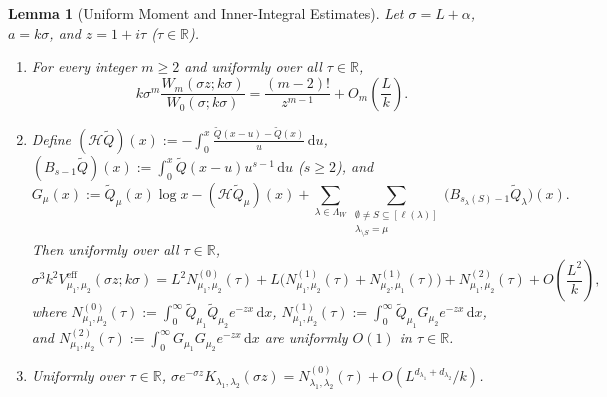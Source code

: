 \documentclass[11pt, reqno]{amsart}
\newtheorem{lemma}{Lemma}[section]
\theoremstyle{remark}
\numberwithin{equation}{section}
\newcommand{\R}{\mathbb{R}}
\newcommand{\cH}{\mathcal{H}}
\newcommand{\dd}{\,\mathrm{d}}
\begin{document}
\begin{lemma}[Uniform Moment and Inner-Integral Estimates]\label{lem:uniform-W-V}
Let $\sigma = L + \alpha$, $a = k\sigma$, and $z = 1+i\tau$ ($\tau \in \R$).
\begin{enumerate}
\item[(i)] For every integer $m \ge 2$ and uniformly over all $\tau \in \R$,
\begin{equation}\label{eq:Wm-uniform}
k \sigma^m \frac{W_m(\sigma z; k\sigma)}{W_0(\sigma; k\sigma)} = \frac{(m-2)!}{z^{m-1}} + O_m\!\left(\frac{L}{k}\right).
\end{equation}
\item[(ii)] Define $(\cH\widetilde{Q})(x) := -\int_0^x \frac{\widetilde{Q}(x-u)-\widetilde{Q}(x)}{u}\dd u$,
$(B_{s-1}\widetilde{Q})(x) := \int_0^x \widetilde{Q}(x-u) u^{s-1}\dd u$ ($s \ge 2$), and
\[
G_\mu(x) := \widetilde{Q}_\mu(x)\log x - (\cH\widetilde{Q}_\mu)(x)
+ \sum_{\lambda\in\Lambda_W}\sum_{\substack{\emptyset\neq S\subseteq[\ell(\lambda)] \\ \lambda_{\setminus S}=\mu}}
\bigl(B_{s_\lambda(S)-1}\widetilde{Q}_\lambda\bigr)(x).
\]
Then uniformly over all $\tau \in \R$,
\begin{equation}\label{eq:V-uniform}
\sigma^3 k^2 V_{\mu_1,\mu_2}^{\mathrm{eff}}(\sigma z; k\sigma)
= L^2 N_{\mu_1,\mu_2}^{(0)}(\tau)
+ L\bigl(N_{\mu_1,\mu_2}^{(1)}(\tau) + N_{\mu_2,\mu_1}^{(1)}(\tau)\bigr)
+ N_{\mu_1,\mu_2}^{(2)}(\tau) + O\!\left(\frac{L^2}{k}\right),
\end{equation}
where $N_{\mu_1,\mu_2}^{(0)}(\tau) := \int_0^\infty \widetilde{Q}_{\mu_1}\widetilde{Q}_{\mu_2} e^{-zx}\dd x$,
$N_{\mu_1,\mu_2}^{(1)}(\tau) := \int_0^\infty \widetilde{Q}_{\mu_1} G_{\mu_2} e^{-zx}\dd x$, and
$N_{\mu_1,\mu_2}^{(2)}(\tau) := \int_0^\infty G_{\mu_1} G_{\mu_2} e^{-zx}\dd x$ are uniformly $O(1)$ in $\tau \in \R$.
\item[(iii)] Uniformly over $\tau \in \R$, $\sigma e^{-\sigma z} K_{\lambda_1,\lambda_2}(\sigma z)
= N_{\lambda_1,\lambda_2}^{(0)}(\tau) + O(L^{d_{\lambda_1}+d_{\lambda_2}}/k)$.
\end{enumerate}
\end{lemma}
\end{document}
